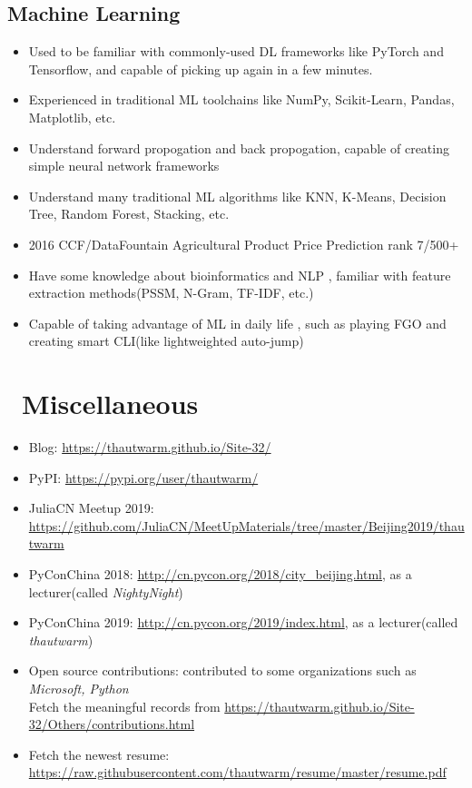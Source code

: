 \documentclass{resume}
\begin{document}
\subsection{\textbf{Machine Learning}}
\begin{itemize}
  \item Used to be familiar with commonly-used DL frameworks like PyTorch and Tensorflow, and capable of picking up again in a few minutes.
  \item Experienced in traditional ML toolchains like NumPy, Scikit-Learn, Pandas, Matplotlib, etc.
  \item Understand forward propogation and back propogation, capable of creating simple neural network frameworks
  \item Understand many traditional ML algorithms like KNN, K-Means, Decision Tree, Random Forest, Stacking, etc.
  \item 2016 CCF/DataFountain Agricultural Product Price Prediction rank 7/500+
  \item Have some knowledge about bioinformatics and NLP
        , familiar with feature extraction methods(PSSM, N-Gram, TF-IDF, etc.)
  \item Capable of taking advantage of ML in daily life
        , such as playing FGO and creating smart CLI(like lightweighted auto-jump)
\end{itemize}

\section{\faInfo\ Miscellaneous}
\begin{itemize}[parsep=0.25ex]
  \item Blog: \url{https://thautwarm.github.io/Site-32/}
  \item PyPI: \url{https://pypi.org/user/thautwarm/}
  \item JuliaCN Meetup 2019: \url{https://github.com/JuliaCN/MeetUpMaterials/tree/master/Beijing2019/thautwarm}
  \item PyConChina 2018: \url{http://cn.pycon.org/2018/city_beijing.html}, as a lecturer(called \textit{NightyNight})
  \item PyConChina 2019: \url{http://cn.pycon.org/2019/index.html}, as a lecturer(called \textit{thautwarm})
  \item Open source contributions: contributed to some organizations such as \textit{Microsoft, Python} \\
        Fetch the meaningful records from \url{https://thautwarm.github.io/Site-32/Others/contributions.html}
  \item Fetch the newest resume: \url{https://raw.githubusercontent.com/thautwarm/resume/master/resume.pdf}
\end{itemize}

%
%
\end{document}

